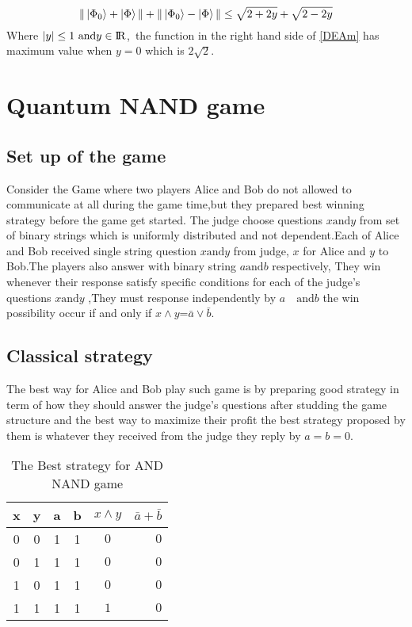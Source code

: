 \begin{equation}\label{DEAm}
\| \ket{\Phi_0}+ \ket{\Phi}\| +\| \ket{\Phi_0}- \ket{\Phi}\| \leq \sqrt{2+2y}+\sqrt{2-2y}
\end{equation} 
Where $|y|\leq 1 \text{ and} y\in {\rm I\!R}$,~the function  in the right hand side of \ref{DEAm} has maximum value  when $y=0$ which is $2\sqrt{2}$.

\section{Quantum NAND game}
\subsection{Set up of the game} \hfill \break
Consider the Game where two players Alice and Bob  do not allowed to  communicate
at all during the game time,but they prepared  best winning strategy  before the game get started\citep{ANDJIGA1988189}. The judge choose  questions $x  \text{and} y$  from set of binary strings which is uniformly  distributed and not dependent.Each of Alice and Bob received single string question $x \text{and} y$ from  judge, $x$ for Alice and $y$ to Bob.The players also answer with binary string  $a \text{and}  b$ respectively, They win whenever their response satisfy specific conditions for each of the judge's questions $x \text{and}  y$ ,They must response independently by  $a \quad \text{and}  b$ the win possibility occur  if and only if $x \wedge y$=$\bar{a}\vee\bar{b}$.
\subsection{Classical strategy}\hfill \break
The best way for Alice and Bob play such game is by preparing good strategy in term of how they should answer the judge's questions after studding the game structure and the best way to maximize their profit the best  strategy proposed by them is whatever they received  from the  judge they reply by $a=b=0$.

\begin {table}[htp]
\begin{center}
\begin{tabular}{ |c|c|c|c|c r| }
  \hline
  x & y & a & b &  $x \wedge y $ & $\bar{a}+\bar{b}$\\
  \hline 
  0 & 0 & 1 & 1 &$0$  & $0$\\
  \hline
  0 &1 & 1 & 1 &$0$  & $0$\\
  \hline
   1 & 0 & 1 & 1 &$0$ &  $0$\\
  \hline
  1 & 1 & 1 & 1 &$1$  & $0$\\
  \hline
\end{tabular}
\caption {The Best strategy for AND NAND game}
\end{center}
\end{table}

